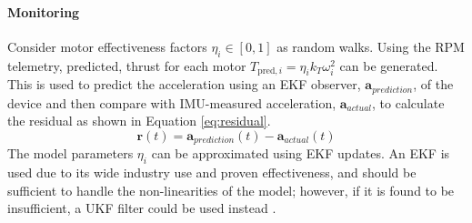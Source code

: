 \paragraph{Monitoring}
Consider motor effectiveness factors $\eta_i \in [0,1]$ as random walks. Using the \gls{RPM} telemetry, predicted, thrust for each motor $T_{\text{pred},i} = \eta_i k_T \omega_i^2$ can be generated. This is used to predict the acceleration using an \gls{EKF} observer, $\mathbf{a}_{prediction}$, of the device and then compare with IMU-measured acceleration,  $\mathbf{a}_{actual}$, to calculate the residual as shown in Equation \ref{eq:residual}. 
\begin{equation}\label{eq:residual}
    \mathbf{r}(t) = \mathbf{a}_{prediction}(t) - \mathbf{a}_{actual}(t)
\end{equation}
The model parameters $\eta_i$ can be approximated using \gls{EKF} updates. An \gls{EKF} is used due to its wide industry use and proven effectiveness, and should be sufficient to handle the non-linearities of the model; however, if it is found to be insufficient, a \gls{UKF} filter could be used instead \cite{WAN2000}.

